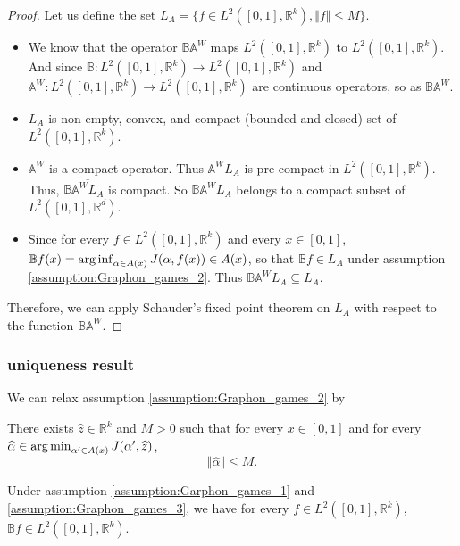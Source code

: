 \begin{proof}
	Let us define the set $L_A = \{ f \in L^2([0,1], \mathbb{R}^k), \Vert f \Vert \leq M \}$.
	
	\begin{itemize}
		\item We know that the operator $\mathbb{B}\mathbb{A}^W$ maps $L^2([0,1], \mathbb{R}^k)$ to $L^2([0,1], \mathbb{R}^k)$. And since $\mathbb{B} : L^2([0,1], \mathbb{R}^k) \to L^2([0,1], \mathbb{R}^k)$ and $\mathbb{A}^W : L^2([0,1], \mathbb{R}^k) \to L^2([0,1],\mathbb{R}^k)$ are continuous operators, so as $\mathbb{B} \mathbb{A}^W$. 
		\item $L_A$ is non-empty, convex, and compact (bounded and closed) set of $L^2([0,1], \mathbb{R}^k)$.
		\item $\mathbb{A}^W$ is a compact operator. Thus $\mathbb{A}^W L_A$ is pre-compact in $L^2([0,1], \mathbb{R}^k)$. Thus, $\mathbb{B} \overline{\mathbb{A}^W L_A}$ is compact. So $\mathbb{B}\mathbb{A}^W L_A$ belongs to a compact subset of $L^2([0,1], \mathbb{R}^d)$.
		\item Since for every $f \in L^2([0,1], \mathbb{R}^k)$ and every $x \in [0,1]$, $\mathbb{B}f(x) = \operatorname*{arg\,inf}_{\alpha \in A(x)} J(\alpha, f(x)) \in A(x)$, so that $\mathbb{B}f \in L_A$ under assumption \ref{assumption:Graphon_games_2}. Thus $\mathbb{B}\mathbb{A}^W L_A \subseteq L_A$.
	\end{itemize}
	
	Therefore, we can apply Schauder's fixed point theorem on $L_A$ with respect to the function $\mathbb{B}\mathbb{A}^W$.
\end{proof}



\subsubsection{uniqueness result}

We can relax assumption \ref{assumption:Graphon_games_2} by 
\begin{assumption}
	There exists $\hat{z} \in \mathbb{R}^k$ and $M >0$ such that for every $x \in [0,1]$ and for every $\widehat{\alpha} \in \operatorname*{arg\,min}_{\alpha' \in A(x)} J(\alpha', \widehat{z})$,
	$$
		\Vert \hat{\alpha} \Vert \leq M.
	$$	
\label{assumption:Graphon_games_3}
\end{assumption}

\begin{lemma}
	Under assumption \ref{assumption:Garphon_games_1} and \ref{assumption:Graphon_games_3}, we have for every $f \in L^2([0,1], \mathbb{R}^k)$, $\mathbb{B}f \in L^2([0,1], \mathbb{R}^k)$.
\end{lemma}

